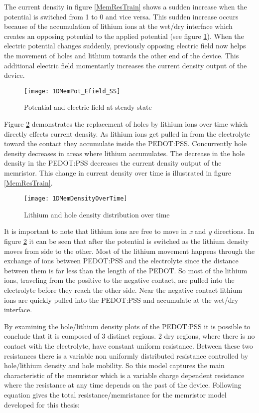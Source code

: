 \begin{doublespace}
The current density in figure \ref{MemResTrain} shows a sudden increase when the potential is switched from 1 to 0 and vice versa. This sudden increase occurs because of the accumulation of lithium ions at the wet/dry interface which creates an opposing potential to the applied potential (see figure \ref{MemEss}). When the electric potential changes suddenly, previously opposing electric field now helps the movement of holes and lithium towards the other end of the device. This additional electric field momentarily increases the current density output of the device.

\begin{figure}[!htp]
\centering
\texttt{[image: 1DMemPot\_Efield\_SS]}
\caption{Potential and electric field at steady state} 
\label{MemEss}
\end{figure}

Figure \ref{MempLi} demonstrates the replacement of holes by lithium ions over time which directly effects current density.  As lithium ions get pulled in from the electrolyte toward the contact they accumulate inside the PEDOT:PSS. Concurrently hole density decreases in areas where lithium accumulates. The decrease in the hole density in the PEDOT:PSS decreases the current density output of the memristor. This change in current density over time is illustrated in figure \ref{MemResTrain}.

\begin{figure}[!htp]
\centering
\texttt{[image: 1DMemDensityOverTime]}
\caption{Lithium and hole density distribution over time} 
\label{MempLi}
\end{figure}

It is important to note that lithium ions are free to move in \textit{x} and \textit{y} directions. In figure \ref{MempLi} it can be seen that after the potential is switched as the lithium density moves from  side to the other. Most of the lithium movement happens through the exchange of ions between PEDOT:PSS and the electrolyte since the distance between them is far less than the length of the PEDOT. So most of the lithium ions, traveling from the positive to the negative contact, are pulled into the electrolyte before they reach the other side. Near the negative contact lithium ions are quickly pulled into the PEDOT:PSS and accumulate at the wet/dry interface. 

By examining the hole/lithium density plots of the PEDOT:PSS it is possible to conclude that it is composed of 3 distinct regions. 2 dry regions, where there is no contact with the electrolyte, have constant uniform resistance. Between these two resistances there is a variable non uniformly distributed resistance controlled by hole/lithium density and hole mobility. So this model captures the main characteristic of the memristor which is a variable charge dependent resistance where the resistance at any time depends on the past of the device. Following equation gives the total resistance/memristance for the memristor model developed for this thesis:


\end{doublespace}
